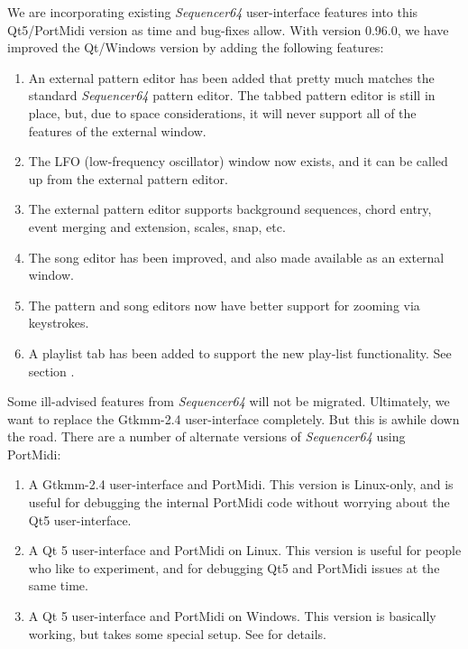    We are incorporating existing \textsl{Sequencer64} user-interface
   features into this Qt5/PortMidi version as time and bug-fixes allow.
   With version 0.96.0, we have improved the Qt/Windows version by adding the
   following features:

   \begin{enumerate}
      \item An external pattern editor has been added that pretty much matches
         the standard \textsl{Sequencer64} pattern editor.  The tabbed
         pattern editor is still in place, but, due to space considerations,
         it will never support all of the features of the external window.
      \item The LFO (low-frequency oscillator) window now exists, and it can be
         called up from the external pattern editor.
      \item The external pattern editor supports background sequences, chord
         entry, event merging and extension, scales, snap, etc.
      \item The song editor has been improved, and also made available as an
         external window.
      \item The pattern and song editors now have better support for zooming
         via keystrokes.
      \item A playlist tab has been added to support the new play-list
         functionality.
         See section .
   \end{enumerate}

   Some ill-advised features from \textsl{Sequencer64} will not be migrated.
   Ultimately, we want to replace the Gtkmm-2.4 user-interface completely.
   But this is awhile down the road.
   There are a number of alternate versions of \textsl{Sequencer64} using
   PortMidi:

   \begin{enumerate}
      \item A Gtkmm-2.4 user-interface and PortMidi.  This version is
         Linux-only, and is useful for debugging the internal PortMidi code
         without worrying about the Qt5 user-interface.
      \item A Qt 5 user-interface and PortMidi on Linux.  This version is
         useful for people who like to experiment, and for debugging Qt5 and
         PortMidi issues at the same time.
      \item A Qt 5 user-interface and PortMidi on Windows.  This version is
         basically working, but takes some special setup.
         See  for details.
   \end{enumerate}

